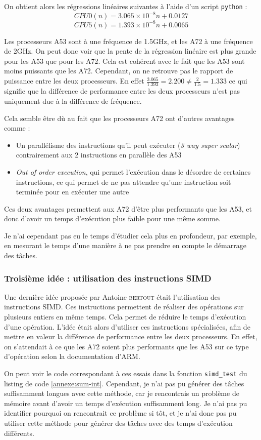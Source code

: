 On obtient alors les régressions linéaires suivantes à l'aide d'un script \texttt{python} :
\[
    CPU0(n) =  3.065 \times 10^{-8} n +  0.0127 
\] 
\[
    CPU5(n) =  1.393 \times 10^{-8} n +  0.0065
\]

Les processeurs A53 sont à une fréquence de 1.5GHz, et les A72 à une fréquence de 2GHz. On peut donc voir que la pente de la régression linéaire est plus grande pour les A53 que pour les A72. Cela est cohérent avec le fait que les A53 sont moins puissants que les A72. Cependant, on ne retrouve pas le rapport de puissance entre les deux processeurs. En effet $\frac{3.065}{1.393} = 2.200 \neq \frac{2}{1.5} = 1.333$ ce qui signifie que la différence de performance entre les deux processeurs n'est pas uniquement due à la différence de fréquence.


Cela semble être dù au fait que les processeurs A72 ont d'autres avantages comme :
\begin{itemize}
    \item Un parallélisme des instructions qu'il peut exécuter (\textit{3 way super scalar}) contrairement aux 2 instructions en parallèle des A53
    \item \textit{Out of order execution}, qui permet l’exécution dans le désordre de certaines instructions, ce qui permet de ne pas attendre qu'une instruction soit terminée pour en exécuter une autre
\end{itemize}

Ces deux avantages permettent aux A72 d'être plus performants que les A53, et donc d'avoir un temps d'exécution plus faible pour une même somme.

Je n'ai cependant pas eu le temps d'étudier cela plus en profondeur, par exemple, en mesurant le temps d'une manière à ne pas prendre en compte le démarrage des tâches. 


\subsubsection{Troisième idée : utilisation des instructions SIMD}

Une dernière idée proposée par Antoine \textsc{bertout} était l'utilisation des instructions SIMD. Ces instructions permettent de réaliser des opérations sur plusieurs entiers en même temps. Cela permet de réduire le temps d'exécution d'une opération. L'idée était alors d'utiliser ces instructions spécialisées, afin de mettre en valeur la différence de performance entre les deux processeurs. En effet, on s'attendait à ce que les A72 soient plus performants que les A53 sur ce type d'opération selon la documentation d'ARM.

On peut voir le code correspondant à ces essais dans la fonction \texttt{simd\_test} du listing de code \ref{annexe:sum-int}. Cependant, je n'ai pas pu générer des tâches suffisamment longues avec cette méthode, car je rencontrais un problème de mémoire avant d'avoir un temps d'exécution suffisamment long. Je n'ai pas pu identifier pourquoi on rencontrait ce problème si tôt, et je n'ai donc pas pu utiliser cette méthode pour générer des tâches avec des temps d'exécution différents.